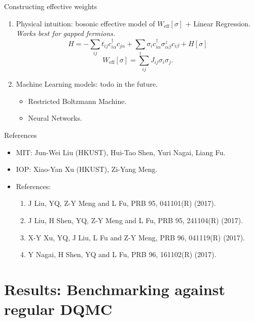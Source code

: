 \documentclass[xcolor=table, 10pt, aspectratio=43]{beamer}
\begin{document}
\begin{frame}{Constructing effective weights}
\begin{enumerate}
  \item Physical intuition: bosonic effective model of $W_{\text{eff}}[\sigma]$
  + Linear Regression.\\
  \emph{Works best for gapped fermions.}
  \[H=-\sum_{ij}t_{ij}c_{i\alpha}^\dagger c_{j\alpha}
  +\sum_i\sigma_ic_{i\alpha}^\dagger\sigma^z_{\alpha\beta} c_{i\beta}
  +H[\sigma]\]
  \[W_{\text{eff}}[\sigma]=\sum_{ij}J_{ij}\sigma_i\sigma_j.\]
  \item Machine Learning models: todo in the future.
  \begin{itemize}
    \item Restricted Boltzmann Machine.
    \item Neural Networks.
  \end{itemize}
\end{enumerate}
\end{frame}

\begin{frame}{References}
\begin{itemize}
\item MIT: Jun-Wei Liu (HKUST), Hui-Tao Shen, Yuri Nagai, Liang Fu.
\item IOP: Xiao-Yan Xu (HKUST), Zi-Yang Meng.
\item References:
\begin{enumerate}
  \item J Liu, YQ, Z-Y Meng and L Fu, PRB 95, 041101(R) (2017).
  \item J Liu, H Shen, YQ, Z-Y Meng and L Fu, PRB 95, 241104(R) (2017).
  \item \alert{X-Y Xu, YQ, J Liu, L Fu and Z-Y Meng, PRB 96, 041119(R) (2017).}
  \item Y Nagai, H Shen, YQ and L Fu, PRB 96, 161102(R) (2017).
\end{enumerate}
\end{itemize}
\end{frame}


\section{Results: Benchmarking against regular DQMC}
\end{document}
